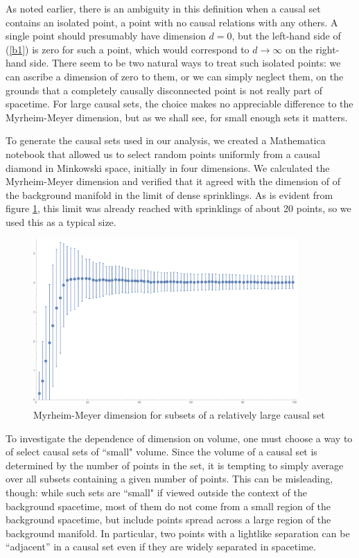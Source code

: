 \documentclass[12pt]{article}
\makeatletter
\def\section{\@startsection{section}{1}{\z@}{3.5ex plus 1ex minus
   .2ex}{2.3ex plus .2ex}{\large\bf}}
\makeatother
\begin{document}
As noted earlier, there is an ambiguity in this definition when a causal set contains an
isolated point, a point with no causal relations with any others.  A single point should
presumably have dimension $d=0$, but the left-hand side of (\ref{b1}) is zero for
such a point, which would correspond to $d\rightarrow\infty$ on the right-hand
side.  There seem to be two natural ways to treat such isolated points: we can ascribe
a dimension of zero to them, or we can simply neglect them, on the grounds that
a completely causally disconnected point is not really part of spacetime.  For large
causal sets, the choice  makes no appreciable difference to the Myrheim-Meyer
dimension, but as we shall see, for small enough sets it matters.

\section{Approach}

To generate the causal sets used in our analysis, we created a Mathematica notebook
\cite{Math} that allowed us to select random points uniformly from a causal diamond in
Minkowski space, initially in four dimensions.   We calculated the Myrheim-Meyer dimension
and verified that it agreed with the dimension of of the background manifold in the  limit
of dense sprinklings.  As is evident from figure \ref{fig1}, this limit was already reached
with sprinklings of about 20 points, so we used this as a typical size.

\begin{figure}
\begin{center}
\includegraphics[height=2.5in]{CSDimRedLrg.pdf}
\caption{Myrheim-Meyer dimension for subsets of a relatively large causal set \label{fig1}}
\end{center}
\end{figure}

To investigate the dependence of dimension on volume, one must choose a way to
of select causal sets of ``small" volume.  Since the volume of a causal set is
determined by the number of points in the set, it is tempting to simply average
over all subsets containing a given number of points.  This can be misleading, though:
while such sets are ``small" if viewed outside the context of the background
spacetime, most of them do not come from a small region of the background spacetime,
but include points spread across a large region of the background manifold.   In
particular, two points with a lightlike separation can be ``adjacent'' in a causal set
even if they are widely separated in spacetime.
\end{document}
